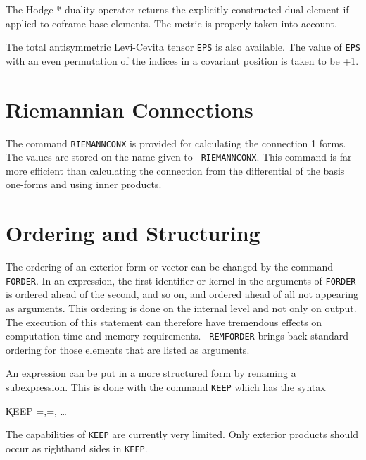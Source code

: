 \documentclass[11pt,letterpaper]{book}
\makeatletter
\newcommand{\underscore}{\_}
\newcommand{\ttindex}[1]{{\renewcommand{\_}{\protect\underscore}%
                          \index{#1@{\tt #1}}}}
\makeatother
\begin{document}
The Hodge-* duality operator returns the explicitly constructed dual
element if applied to coframe base elements. The metric is properly
taken into account.

\index{Levi-Cevita tensor}\ttindex{EPS}
The total antisymmetric Levi-Cevita tensor {\tt EPS}\label{EPS} is
also available.  The value of {\tt EPS} with an even permutation of the
indices in a covariant position is taken to be +1.


\section{Riemannian Connections}

The command {\tt RIEMANNCONX} is provided for calculating the
 \label{RIEMANNCONX}
connection 1 forms.  The values are stored on the name given to {\tt
RIEMANNCONX}.  This command is far more efficient than calculating the
connection from the differential of the basis one-forms and using
inner products.

\section{Ordering and Structuring}

The ordering of an exterior form or vector can be changed by the
command {\tt FORDER}.\label{FORDER}  In an expression, the first
identifier or kernel in the arguments of {\tt FORDER} is ordered ahead
of the second, and so on, and ordered ahead of all not appearing as
arguments.  This ordering is done on the internal level and not only
on output.  The execution of this statement can therefore have
tremendous effects on computation time and memory requirements.  {\tt
REMFORDER}\label{REMFORDER} brings back standard ordering for those
elements that are listed as arguments.

An expression can be put in a more structured form by renaming a
subexpression.  This is done with the command {\tt KEEP} which
has the syntax\label{KEEP}

\hspace*{2em} \k{KEEP}
=,=, \ldots

The capabilities of {\tt KEEP} are currently very limited.  Only exterior
products should occur as righthand sides in {\tt KEEP}.
\end{document}

